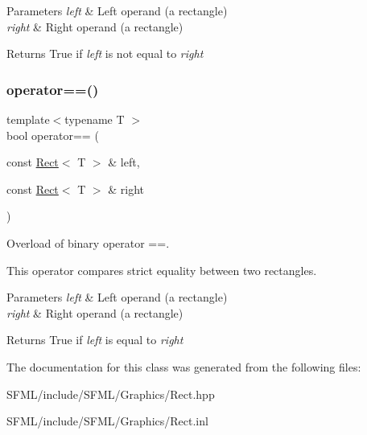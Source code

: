 \begin{DoxyParams}{Parameters}
{\em left} & Left operand (a rectangle) \\
\hline
{\em right} & Right operand (a rectangle)\\
\hline
\end{DoxyParams}
\begin{DoxyReturn}{Returns}
True if {\itshape left} is not equal to {\itshape right} \begin{DoxyVerb}\end{DoxyVerb}
 
\end{DoxyReturn}
\mbox{\label{classsf_1_1_rect_ab3488b5dbd0e587c4d7cb80605affc46}} 
\subsubsection{\texorpdfstring{operator==()}{operator==()}}
{\footnotesize\ttfamily template$<$typename T $>$ \\
bool operator== (\begin{DoxyParamCaption}\item[{const \mbox{\hyperlink{classsf_1_1_rect}{Rect}}$<$ T $>$ \&}]{left,  }\item[{const \mbox{\hyperlink{classsf_1_1_rect}{Rect}}$<$ T $>$ \&}]{right }\end{DoxyParamCaption})\hspace{0.3cm}{\ttfamily [related]}}



Overload of binary operator ==. 

This operator compares strict equality between two rectangles.


\begin{DoxyParams}{Parameters}
{\em left} & Left operand (a rectangle) \\
\hline
{\em right} & Right operand (a rectangle)\\
\hline
\end{DoxyParams}
\begin{DoxyReturn}{Returns}
True if {\itshape left} is equal to {\itshape right} \begin{DoxyVerb}\end{DoxyVerb}
 
\end{DoxyReturn}


The documentation for this class was generated from the following files\+:\begin{DoxyCompactItemize}
\item 
S\+F\+M\+L/include/\+S\+F\+M\+L/\+Graphics/Rect.\+hpp\item 
S\+F\+M\+L/include/\+S\+F\+M\+L/\+Graphics/Rect.\+inl\end{DoxyCompactItemize}
